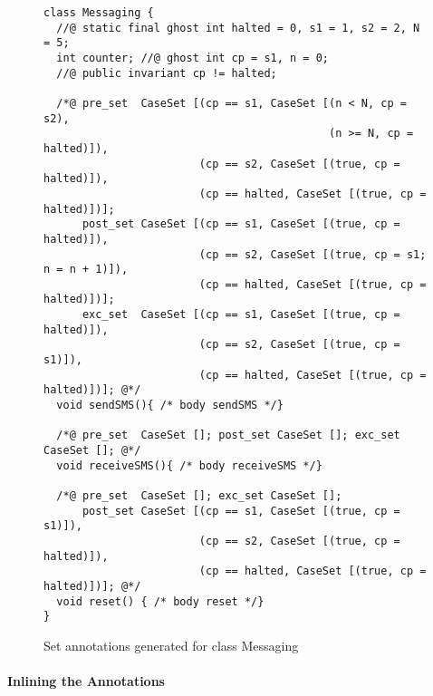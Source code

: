 \begin{figure}[t]
{\small\begin{verbatim}
class Messaging {
  //@ static final ghost int halted = 0, s1 = 1, s2 = 2, N = 5;
  int counter; //@ ghost int cp = s1, n = 0;
  //@ public invariant cp != halted;

  /*@ pre_set  CaseSet [(cp == s1, CaseSet [(n < N, cp = s2),
                                            (n >= N, cp = halted)]),
                        (cp == s2, CaseSet [(true, cp = halted)]),
                        (cp == halted, CaseSet [(true, cp = halted)])];
      post_set CaseSet [(cp == s1, CaseSet [(true, cp = halted)]),
                        (cp == s2, CaseSet [(true, cp = s1; n = n + 1)]),
                        (cp == halted, CaseSet [(true, cp = halted)])];
      exc_set  CaseSet [(cp == s1, CaseSet [(true, cp = halted)]),
                        (cp == s2, CaseSet [(true, cp = s1)]),
                        (cp == halted, CaseSet [(true, cp = halted)])]; @*/
  void sendSMS(){ /* body sendSMS */}

  /*@ pre_set  CaseSet []; post_set CaseSet []; exc_set  CaseSet []; @*/
  void receiveSMS(){ /* body receiveSMS */}

  /*@ pre_set  CaseSet []; exc_set CaseSet [];
      post_set CaseSet [(cp == s1, CaseSet [(true, cp = s1)]),
                        (cp == s2, CaseSet [(true, cp = halted)]),
                        (cp == halted, CaseSet [(true, cp = halted)])]; @*/
  void reset() { /* body reset */}
}
\end{verbatim}}
\caption{Set annotations generated for class Messaging}\label{FigExampleStep2}
\end{figure}



\paragraph{Inlining the Annotations}

